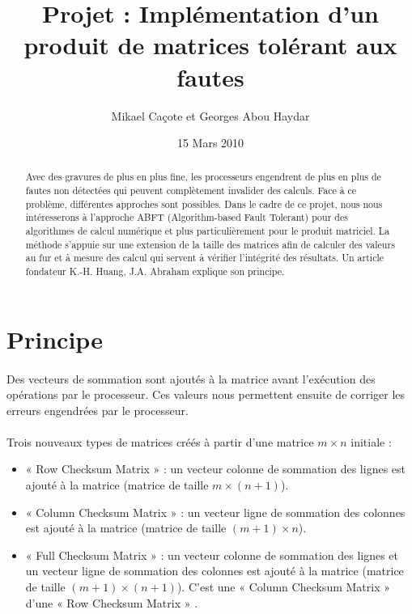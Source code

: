 \documentclass[a4paper,12pt]{report}
\title{Projet : Implémentation d'un produit de matrices tolérant
aux fautes
}
\author{Mikael Caçote et Georges Abou Haydar}
\date{15 Mars 2010}
\begin{document}
\maketitle
\renewcommand{\abstractname}{Introduction}
\renewcommand{\labelitemi}{$\bullet$}
\renewcommand{\labelitemii}{$\cdot$}
\begin{abstract}
 Avec des gravures de plus en plus fine, les processeurs engendrent de plus en plus de fautes non détectées qui peuvent complètement invalider des calculs. Face à ce problème, différentes approches sont possibles. Dans le cadre de ce projet, nous nous intéresserons à l'approche ABFT (Algorithm-based Fault Tolerant) pour des algorithmes de calcul numérique et plus particulièrement pour le produit matriciel. La méthode s'appuie sur une extension de la taille des matrices afin de calculer des valeurs au fur et à mesure des calcul qui servent à vérifier l'intégrité des résultats. Un article fondateur K.-H. Huang, J.A. Abraham explique son principe. 
\end{abstract}

\section{Principe}
\paragraph*{}
Des vecteurs de sommation sont ajoutés à la matrice avant l’exécution des opérations
par le processeur.\newline
Ces valeurs nous permettent ensuite de corriger les erreurs engendrées par le processeur.
\paragraph*{}
Trois nouveaux types de matrices créés à partir d’une matrice $ m \times n $ initiale :
\begin{itemize}
 \item « Row Checksum Matrix » : un vecteur colonne de sommation des lignes est
ajouté à la matrice (matrice de taille $ m \times (n+1) $).
 \item « Column Checksum Matrix » : un vecteur ligne de sommation des colonnes est
  ajouté à la matrice (matrice de taille $ (m+1) \times n $).
 \item « Full Checksum Matrix » : un vecteur colonne de sommation des lignes et un
  vecteur ligne de sommation des colonnes est ajouté à la matrice (matrice de
  taille $ (m+1) \times (n+1) $). C’est une « Column Checksum Matrix » d’une « Row
  Checksum Matrix » .
\end{itemize}
\end{document}
